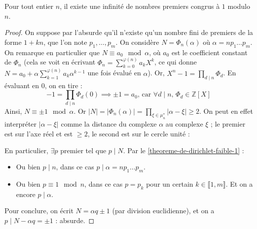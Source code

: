 	\begin{theorem}
		Pour tout entier $n$, il existe une infinité de nombres premiers congrus à $1$ modulo $n$.
	\end{theorem}

	\begin{proof}
		On suppose par l'absurde qu'il n'existe qu'un nombre fini de premiers de la forme $1+kn$, que l'on note $p_1, \dots, p_m$. On considère $N = \Phi_n(\alpha)$ où $\alpha = n p_1 \dots p_m$. On remarque en particulier que $N \equiv a_0 \mod \alpha$, où $a_0$ est le coefficient constant de $\Phi_n$ (cela se voit en écrivant $\Phi_n = \sum_{k=0}^{\varphi(n)} a_k X^k$, ce qui donne $N = a_0 + \alpha \sum_{k=1}^{\varphi(n)} a_k \alpha^{k-1}$ une fois évalué en $\alpha$).
		\newpar
		Or, $X^n - 1 = \prod_{d \mid n} \Phi_d$. En évaluant en $0$, on en tire :
		\[ -1 = \prod_{d \mid n} \Phi_d(0) \implies \pm 1 = a_0 \text{, car } \forall d \mid n, \, \Phi_d \in \mathbb{Z}[X] \]
		Ainsi, $N \equiv \pm 1 \mod \alpha$. Or $|N| = |\Phi_n(\alpha)| = \prod_{\xi \in \mu_n^*} |\alpha - \xi| \geq 2$. On peut en effet interpréter $|\alpha - \xi|$ comme la distance du complexe $\alpha$ au complexe $\xi$ ; le premier est sur l'axe réel et est $\geq 2$, le second est sur le cercle unité :
		\begin{center}
		\end{center}
		En particulier, $\exists p$ premier tel que $p \mid N$. Par le \cref{theoreme-de-dirichlet-faible-1} :
		\begin{itemize}
			\item Ou bien $p \mid n$, dans ce cas $p \mid \alpha = n p_1 \dots p_m$.
			\item Ou bien $p \equiv 1 \mod n$, dans ce cas $p = p_k$ pour un certain $k \in \llbracket 1, m \rrbracket$. Et on a encore $p \mid \alpha$.
		\end{itemize}
		Pour conclure, on écrit $N = \alpha q \pm 1$ (par division euclidienne), et on a $p \mid N - \alpha q = \pm 1$ : absurde.
	\end{proof}

